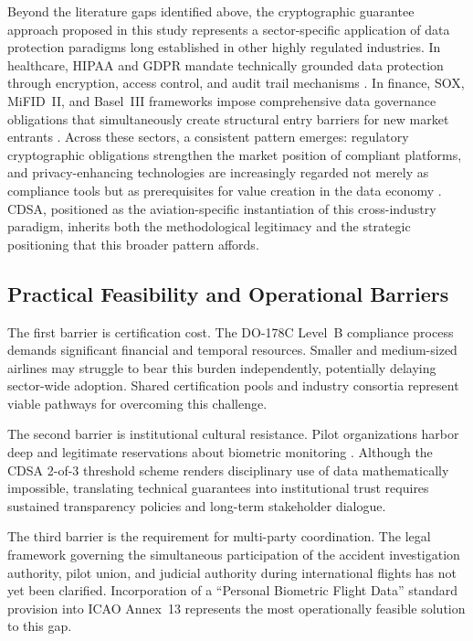 \documentclass[12pt,a4paper]{article}
\begin{document}
Beyond the literature gaps identified above, the cryptographic guarantee approach proposed in
this study represents a sector-specific application of data protection paradigms long established
in other highly regulated industries. In healthcare, HIPAA and GDPR mandate technically grounded
data protection through encryption, access control, and audit trail mechanisms \citep{conduah2025}.
In finance, SOX, MiFID~II, and Basel~III frameworks impose comprehensive data governance
obligations that simultaneously create structural entry barriers for new market entrants
\citep{mcnulty2023}. Across these sectors, a consistent pattern emerges: regulatory cryptographic
obligations strengthen the market position of compliant platforms, and privacy-enhancing
technologies are increasingly regarded not merely as compliance tools but as prerequisites for
value creation in the data economy \citep{nitrd2022}. CDSA, positioned as the aviation-specific
instantiation of this cross-industry paradigm, inherits both the methodological legitimacy and
the strategic positioning that this broader pattern affords.

\subsection{Practical Feasibility and Operational Barriers}

The first barrier is certification cost. The DO-178C Level~B compliance process demands
significant financial and temporal resources. Smaller and medium-sized airlines may struggle to
bear this burden independently, potentially delaying sector-wide adoption. Shared certification
pools and industry consortia represent viable pathways for overcoming this challenge.

The second barrier is institutional cultural resistance. Pilot organizations harbor deep and
legitimate reservations about biometric monitoring \citep{alpa2022}. Although the CDSA 2-of-3
threshold scheme renders disciplinary use of data mathematically impossible, translating
technical guarantees into institutional trust requires sustained transparency policies and
long-term stakeholder dialogue.

The third barrier is the requirement for multi-party coordination. The legal framework governing
the simultaneous participation of the accident investigation authority, pilot union, and judicial
authority during international flights has not yet been clarified. Incorporation of a ``Personal
Biometric Flight Data'' standard provision into ICAO Annex~13 represents the most operationally
feasible solution to this gap.
\end{document}
